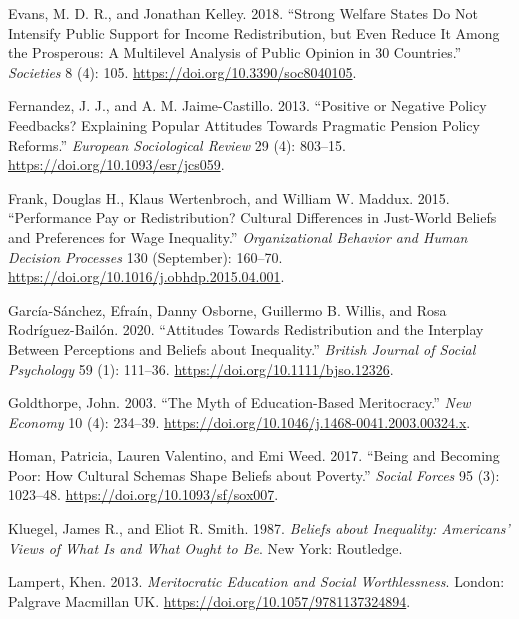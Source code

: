 \documentclass[
  letterpaper,
  DIV=11,
  numbers=noendperiod]{scrartcl}
\newlength{\cslhangindent}
\newenvironment{CSLReferences}[2] %
 {\begin{list}{}{%
  \setlength{\itemindent}{0pt}
  \setlength{\leftmargin}{0pt}
  \setlength{\parsep}{0pt}
  \ifodd #1
   \setlength{\leftmargin}{\cslhangindent}
   \setlength{\itemindent}{-1\cslhangindent}
  \fi
  \setlength{\itemsep}{#2\baselineskip}}}
 {\end{list}}
\begin{document}
\begin{CSLReferences}{1}{0}
Evans, M. D. R., and Jonathan Kelley. 2018. {``Strong Welfare States Do
Not Intensify Public Support for Income Redistribution, but Even Reduce
It Among the Prosperous: A Multilevel Analysis of Public Opinion in 30
Countries.''} \emph{Societies} 8 (4): 105.
\url{https://doi.org/10.3390/soc8040105}.

Fernandez, J. J., and A. M. Jaime-Castillo. 2013. {``Positive or
Negative Policy Feedbacks? Explaining Popular Attitudes Towards
Pragmatic Pension Policy Reforms.''} \emph{European Sociological Review}
29 (4): 803--15. \url{https://doi.org/10.1093/esr/jcs059}.

Frank, Douglas H., Klaus Wertenbroch, and William W. Maddux. 2015.
{``Performance Pay or Redistribution? Cultural Differences in Just-World
Beliefs and Preferences for Wage Inequality.''} \emph{Organizational
Behavior and Human Decision Processes} 130 (September): 160--70.
\url{https://doi.org/10.1016/j.obhdp.2015.04.001}.

García-Sánchez, Efraín, Danny Osborne, Guillermo B. Willis, and Rosa
Rodríguez-Bailón. 2020. {``Attitudes Towards Redistribution and the
Interplay Between Perceptions and Beliefs about Inequality.''}
\emph{British Journal of Social Psychology} 59 (1): 111--36.
\url{https://doi.org/10.1111/bjso.12326}.

Goldthorpe, John. 2003. {``The Myth of Education-Based Meritocracy.''}
\emph{New Economy} 10 (4): 234--39.
\url{https://doi.org/10.1046/j.1468-0041.2003.00324.x}.

Homan, Patricia, Lauren Valentino, and Emi Weed. 2017. {``Being and
Becoming Poor: How Cultural Schemas Shape Beliefs about Poverty.''}
\emph{Social Forces} 95 (3): 1023--48.
\url{https://doi.org/10.1093/sf/sox007}.

Kluegel, James R., and Eliot R. Smith. 1987. \emph{Beliefs about
Inequality: Americans' Views of What Is and What Ought to Be}. New York:
Routledge.

Lampert, Khen. 2013. \emph{Meritocratic Education and Social
Worthlessness}. London: Palgrave Macmillan UK.
\url{https://doi.org/10.1057/9781137324894}.


\end{CSLReferences}
\end{document}
